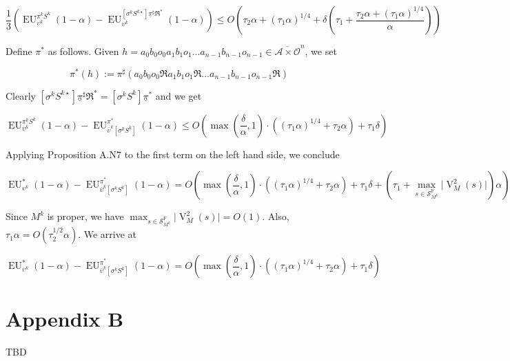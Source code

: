 \documentclass[a4paper]{article}
\newcommand{\Comment}[1]{}
\newcommand{\AP}[1]{\left(#1\right)}
\newcommand{\AB}[1]{\left[#1\right]}
\newcommand{\Abs}[1]{\lvert #1 \rvert}
\newcommand{\Ob}{\mathcal{O}}
\newcommand{\A}{\mathcal{A}}
\newcommand{\St}{\mathcal{S}}
\newcommand{\RMF}{\mathrm{F}}
\newcommand{\SF}{\St^{\RMF}}
\newcommand{\V}{\operatorname{V}}
\newcommand{\EU}{\operatorname{EU}}
\begin{document}
$$\frac{1}{3}\AP{\EU_{\upsilon^k}^{\pi^k S^{k}}(1-\alpha)-\EU_{\upsilon^k}^{\AB{\sigma^k S^{k\star}}\underline{\pi}^\sharp\Re^*}(1-\alpha)} \leq O\AP{\tau_2 \alpha + (\tau_1 \alpha)^{1/4} + \delta\AP{\tau_1+\frac{\tau_2 \alpha + (\tau_1 \alpha)^{1/4}}{\alpha}}}$$

\Comment{Given $h = a_0 b_0 o_0 a_1 b_1 o_1 \ldots a_{n-1} b_{n-1} o_{n-1} \in \overline{\A \times \Ob}^n$, we use the notation 

$$\bar{\Re}^*h := a_0 b_0 o_0 \Re a_1 b_1 o_1 \Re \ldots a_{n-1} b_{n-1} o_{n-1} \Re \in \overline{\A \times \Ob'}^n$$

We define $\pi^*$ as by $\pi^*(h) := \pi^\star\AP{\bar{\Re}^*h}$.}

Define $\pi^*$ as follows. Given $h = a_0 b_0 o_0 a_1 b_1 o_1 \ldots a_{n-1} b_{n-1} o_{n-1} \in \overline{\A \times \Ob}^n$, we set

$$\pi^*(h) := \pi^\sharp\AP{a_0 b_0 o_0 \Re a_1 b_1 o_1 \Re \ldots a_{n-1} b_{n-1} o_{n-1} \Re}$$

Clearly $\AB{\sigma^k S^{k\star}}\underline{\pi}^\sharp\Re^* = \AB{\sigma^k S^{k}}\underline{\pi}^*$ and we get

$$\EU_{\upsilon^k}^{\pi^k S^{k}}(1-\alpha)-\EU_{\bar{\upsilon}^k\AB{\sigma^k S^{k}}}^{\pi^*}(1-\alpha) \leq O\AP{\max\AP{\frac{\delta}{\alpha},1}\cdot\AP{(\tau_1 \alpha)^{1/4} + \tau_2 \alpha}+\tau_1\delta}$$

Applying Proposition A.N7 to the first term on the left hand side, we conclude

$$\EU_{\upsilon^k}^{*}(1-\alpha)-\EU_{\bar{\upsilon}^k\AB{\sigma^k S^{k}}}^{\pi^*}(1-\alpha) = O\AP{\max\AP{\frac{\delta}{\alpha},1}\cdot\AP{(\tau_1 \alpha)^{1/4} + \tau_2 \alpha}+\tau_1\delta + \AP{\tau_1 + \max_{s\in\SF_{M^k}}\Abs{\V_{M}^2(s)}}\alpha}$$

Since $M^k$ is proper, we have $\max_{s\in\SF_{M^k}}\Abs{\V_{M}^2(s)} = O(1)$. Also, $\tau_1 \alpha = O(\tau_2^{1/2} \alpha)$. We arrive at

$$\EU_{\upsilon^k}^{*}(1-\alpha)-\EU_{\bar{\upsilon}^k\AB{\sigma^k S^{k}}}^{\pi^*}(1-\alpha) = O\AP{\max\AP{\frac{\delta}{\alpha},1}\cdot\AP{(\tau_1 \alpha)^{1/4} + \tau_2 \alpha}+\tau_1\delta}$$

\section{Appendix B}

TBD
\end{document}
